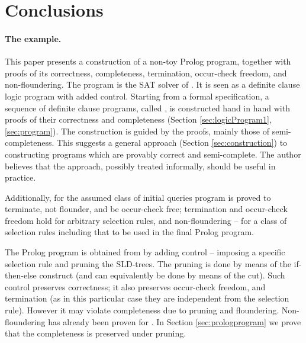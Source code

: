 \documentclass{tlp}
\begin{document}
{\section{Conclusions}

\paragraph{The example.}
This paper presents a construction of a non-toy Prolog program,
together with proofs of its correctness, completeness,
termination, occur-check freedom, and non-floundering.
The program is the SAT solver of .  
It is seen as a definite clause logic program with added control.
Starting from a formal specification, a 
sequence of definite clause programs, called ,
is constructed hand in hand with proofs of their correctness and completeness 
(Section \ref{sec:logicProgram1},\,\ref{sec:program}).
The construction is guided by the proofs, mainly those of semi-completeness.
This suggests a general approach (Section \ref{sec:construction})
to constructing programs which are provably correct and semi-complete.
The author believes that the approach, possibly treated informally,
should be useful in practice.


Additionally, for the assumed class of initial queries
program  is proved to terminate, not flounder, and be occur-check free;
  termination and occur-check freedom hold for arbitrary selection rules,
  and non-floundering -- for a class of selection rules including that to be
  used in the final Prolog program.







The Prolog program is obtained from  by adding control --
imposing a specific selection rule and pruning the SLD-trees.
The pruning is done by means of the if-then-else
construct (and can equivalently be done by means of the cut).
Such control preserves correctness; it also preserves 
occur-check freedom, and termination 
(as in this particular case they are independent from the selection rule).
However it may violate completeness due to pruning 
and floundering.  Non-floundering has already been proven for .
In Section \ref{sec:prologprogram} 
we prove that the completeness is preserved under pruning.




















}
\end{document}
